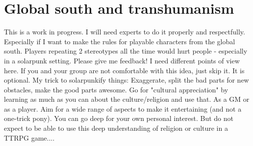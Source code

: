 




\section{Global south and transhumanism}
\label{sec:Transhumanism}
\label{sec:Global South}

\begin{warning}
    This is a work in progress. I will need experts to do it properly and respectfully. Especially if I want to make the rules for playable characters from the global south. Players repeating 2 stereotypes all the time would hurt people - especially in a solarpunk setting.
    Please give me feedback! I need different points of view here.
    If you and your group are not comfortable with this idea, just skip it. It is optional.
    My trick to solarpunkify things: Exaggerate, split the bad parts for new obstacles, make the good parts awesome. Go for "cultural appreciation" by learning as much as you can about the culture/religion and use that. As a GM or as a player. Aim for a wide range of aspects to make it entertaining (and not a one-trick pony). You can go deep for your own personal interest. But do not expect to be able to use this deep understanding of religion or culture in a TTRPG game....
\end{warning}


